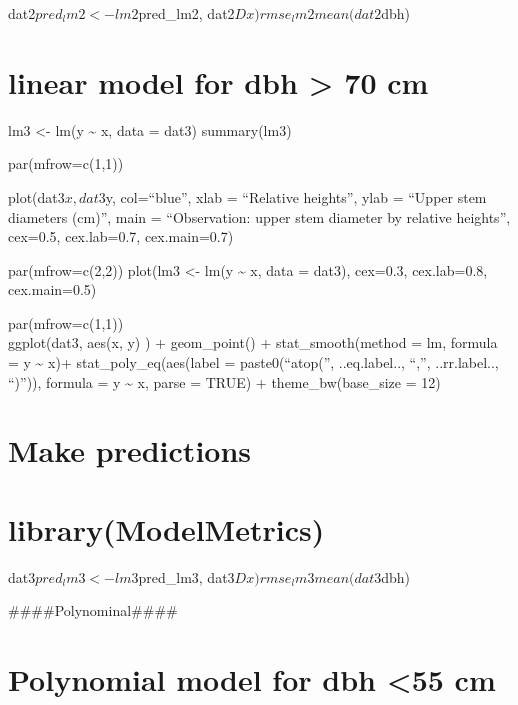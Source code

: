 \documentclass[
]{article}
\begin{document}
dat2\(pred_lm2 <- lm2 %
\)pred\_lm2, dat2\(Dx) rmse_lm2 mean(dat2\)dbh)

\hypertarget{linear-model-for-dbh-70-cm}{%
\section{linear model for dbh \textgreater{} 70
cm}\label{linear-model-for-dbh-70-cm}}

lm3 \textless- lm(y \textasciitilde{} x, data = dat3) summary(lm3)

par(mfrow=c(1,1))

plot(dat3\(x, dat3\)y, col=``blue'', xlab = ``Relative heights'', ylab =
``Upper stem diameters (cm)'', main = ``Observation: upper stem diameter
by relative heights'', cex=0.5, cex.lab=0.7, cex.main=0.7)

par(mfrow=c(2,2)) plot(lm3 \textless- lm(y \textasciitilde{} x, data =
dat3), cex=0.3, cex.lab=0.8, cex.main=0.5)

par(mfrow=c(1,1))\\
ggplot(dat3, aes(x, y) ) + geom\_point() + stat\_smooth(method = lm,
formula = y \textasciitilde{} x)+ stat\_poly\_eq(aes(label =
paste0(``atop('', ..eq.label.., ``,'', ..rr.label.., ``)'')), formula =
y \textasciitilde{} x, parse = TRUE) + theme\_bw(base\_size = 12)

\hypertarget{make-predictions-2}{%
\section{Make predictions}\label{make-predictions-2}}

\hypertarget{librarymodelmetrics-2}{%
\section{library(ModelMetrics)}\label{librarymodelmetrics-2}}

dat3\(pred_lm3 <- lm3 %
\)pred\_lm3, dat3\(Dx) rmse_lm3 mean(dat3\)dbh)

\#\#\#\#Polynominal\#\#\#\#

\hypertarget{polynomial-model-for-dbh-55-cm}{%
\section{Polynomial model for dbh \textless55
cm}\label{polynomial-model-for-dbh-55-cm}}
\end{document}
